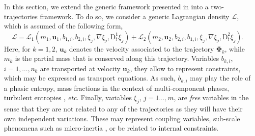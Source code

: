 \documentclass{myclass}
\newcommand{\Lag}{\mathscr{L}}
\newcommand{\Dt}{\mathrm{D}_t}
\newcommand{\Traj}{\bm{\Phi}}
\newcommand{\vel}{\bm{u}}
\newcommand{\pth}[1]  {\left( #1 \right)}
\begin{document}
In this section, we extend the generic framework presented in \cite{haegeman_GenSAP:2025} into a two-trajectories framework. To do so, we consider a generic Lagrangian density $\Lag$, which is assumed of the following form,
\begin{equation}\label{eq:generic_Lagrangian}
\Lag = \Lag_1\pth{m_1,\vel_1,b_{1,i},b_{2,i}, \xi_j,\nabla\xi_j,\Dt^1\xi_j} +  \Lag_2\pth{m_2,\vel_2,b_{2,i},b_{1,i}, \xi_j,\nabla\xi_j,\Dt^2\xi_j}.
\end{equation}
Here, for $k=1,2$, $\vel_k$ denotes the velocity associated to the trajectory $\Traj_k$, while $m_k$ is the partial mass that is conserved along this trajectory. Variables $b_{k,i}$, $i=1,\ldots,n_k$ are transported at velocity $\vel_k$, they allow to represent constraints, which may be expressed as transport equations. As such, $b_{k,i}$ may play the role of a phasic entropy, mass fractions in the context of multi-component phases, turbulent entropies \cite{saurel:2003,herard:2003,haegeman_RelVel:2025}, \textit{etc}.  Finally, variables $\xi_j$, $j=1\ldots,m$, are \textit{free} variables in the sense that they are not related to any of the trajectories as they will have their own independent variations. These may represent coupling variables, sub-scale phenomena such as micro-inertia \cite{gavrilyuk:2002}, or be related to internal constraints.
\end{document}
